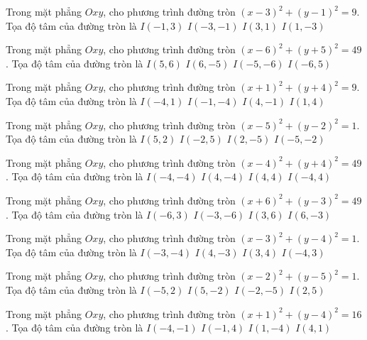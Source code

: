 \begin{ex}
Trong mặt phẳng $Oxy$, cho phương trình đường tròn $(x -3)^2   + (y -1)^2 = 9$. Tọa độ tâm của đường tròn là
\choice
{ $I(-1, 3)$ }
{ $I(-3, -1)$ }
{ \True $I(3, 1)$ }
{ $I(1, -3)$ }
\end{ex}

\begin{ex}
Trong mặt phẳng $Oxy$, cho phương trình đường tròn $(x -6)^2   + (y + 5)^2 = 49$. Tọa độ tâm của đường tròn là
\choice
{ $I(5, 6)$ }
{ \True $I(6, -5)$ }
{ $I(-5, -6)$ }
{ $I(-6, 5)$ }
\end{ex}

\begin{ex}
Trong mặt phẳng $Oxy$, cho phương trình đường tròn $(x + 1)^2  + (y + 4)^2 = 9$. Tọa độ tâm của đường tròn là
\choice
{ $I(-4, 1)$ }
{ \True $I(-1, -4)$ }
{ $I(4, -1)$ }
{ $I(1, 4)$ }
\end{ex}

\begin{ex}
Trong mặt phẳng $Oxy$, cho phương trình đường tròn $(x -5)^2   + (y -2)^2 = 1$. Tọa độ tâm của đường tròn là
\choice
{ \True $I(5, 2)$ }
{ $I(-2, 5)$ }
{ $I(2, -5)$ }
{ $I(-5, -2)$ }
\end{ex}

\begin{ex}
Trong mặt phẳng $Oxy$, cho phương trình đường tròn $(x -4)^2   + (y + 4)^2 = 49$. Tọa độ tâm của đường tròn là
\choice
{ $I(-4, -4)$ }
{ \True $I(4, -4)$ }
{ $I(4, 4)$ }
{ $I(-4, 4)$ }
\end{ex}

\begin{ex}
Trong mặt phẳng $Oxy$, cho phương trình đường tròn $(x + 6)^2  + (y -3)^2 = 49$. Tọa độ tâm của đường tròn là
\choice
{ \True $I(-6, 3)$ }
{ $I(-3, -6)$ }
{ $I(3, 6)$ }
{ $I(6, -3)$ }
\end{ex}

\begin{ex}
Trong mặt phẳng $Oxy$, cho phương trình đường tròn $(x -3)^2   + (y -4)^2 = 1$. Tọa độ tâm của đường tròn là
\choice
{ $I(-3, -4)$ }
{ $I(4, -3)$ }
{ \True $I(3, 4)$ }
{ $I(-4, 3)$ }
\end{ex}

\begin{ex}
Trong mặt phẳng $Oxy$, cho phương trình đường tròn $(x -2)^2   + (y -5)^2 = 1$. Tọa độ tâm của đường tròn là
\choice
{ $I(-5, 2)$ }
{ $I(5, -2)$ }
{ $I(-2, -5)$ }
{ \True $I(2, 5)$ }
\end{ex}

\begin{ex}
Trong mặt phẳng $Oxy$, cho phương trình đường tròn $(x + 1)^2  + (y -4)^2 = 16$. Tọa độ tâm của đường tròn là
\choice
{ $I(-4, -1)$ }
{ \True $I(-1, 4)$ }
{ $I(1, -4)$ }
{ $I(4, 1)$ }
\end{ex}

